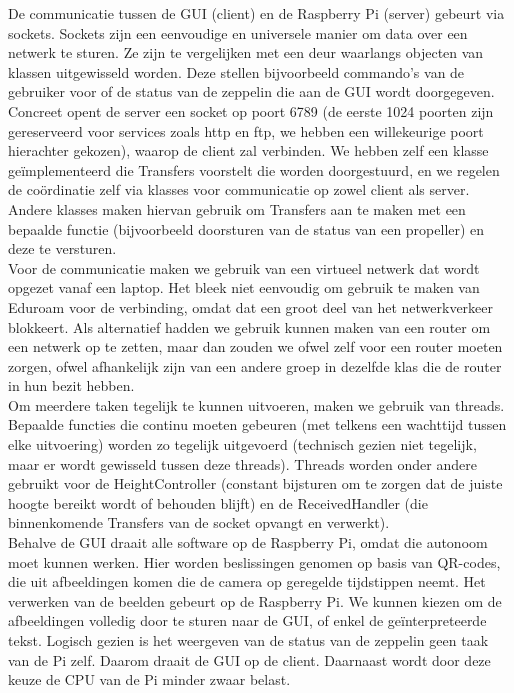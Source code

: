 \documentclass[eind]{penoverslag}
\begin{document}
De communicatie tussen de GUI (client) en de Raspberry Pi (server) gebeurt via sockets. Sockets zijn een eenvoudige en universele manier om data over een netwerk te sturen. Ze zijn te vergelijken met een deur waarlangs objecten van klassen uitgewisseld worden. Deze stellen bijvoorbeeld commando's van de gebruiker voor of de status van de zeppelin die aan de GUI wordt doorgegeven. Concreet opent de server een socket op poort 6789 (de eerste 1024 poorten zijn gereserveerd voor services zoals http en ftp, we hebben een willekeurige poort hierachter gekozen), waarop de client zal verbinden. We hebben zelf een klasse ge\"implementeerd die Transfers voorstelt die worden doorgestuurd, en we regelen de co\"ordinatie zelf via klasses voor communicatie op zowel client als server. Andere klasses maken hiervan gebruik om Transfers aan te maken met een bepaalde functie (bijvoorbeeld doorsturen van de status van een propeller) en deze te versturen. \\

Voor de communicatie maken we gebruik van een virtueel netwerk dat wordt opgezet vanaf een laptop. Het bleek niet eenvoudig om gebruik te maken van Eduroam voor de verbinding, omdat dat een groot deel van het netwerkverkeer blokkeert. Als alternatief hadden we gebruik kunnen maken van een router om een netwerk op te zetten, maar dan zouden we ofwel zelf voor een router moeten zorgen, ofwel afhankelijk zijn van een andere groep in dezelfde klas die de router in hun bezit hebben. \\

Om meerdere taken tegelijk te kunnen uitvoeren, maken we gebruik van threads. Bepaalde functies die continu moeten gebeuren (met telkens een wachttijd tussen elke uitvoering) worden zo tegelijk uitgevoerd (technisch gezien niet tegelijk, maar er wordt gewisseld tussen deze threads). Threads worden onder andere gebruikt voor de HeightController (constant bijsturen om te zorgen dat de juiste hoogte bereikt wordt of behouden blijft) en de ReceivedHandler (die binnenkomende Transfers van de socket opvangt en verwerkt). \\

Behalve de GUI draait alle software op de Raspberry Pi, omdat die autonoom moet kunnen werken. Hier worden beslissingen genomen op basis van QR-codes, die uit afbeeldingen komen die de camera op geregelde tijdstippen neemt. Het verwerken van de beelden gebeurt op de Raspberry Pi. We kunnen kiezen om de afbeeldingen volledig door te sturen naar de GUI, of enkel de ge\"interpreteerde tekst. Logisch gezien is het weergeven van de status van de zeppelin geen taak van de Pi zelf. Daarom draait de GUI op de client. Daarnaast wordt door deze keuze de CPU van de Pi minder zwaar belast. \\
\end{document}
